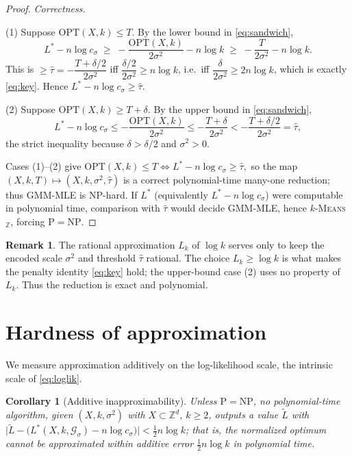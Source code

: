 \documentclass{amsart}
\theoremstyle{plain}
\newtheorem{corollary}{Corollary}
\theoremstyle{definition}
\newtheorem{remark}{Remark}
\newcommand{\Z}{\mathbb{Z}}
\begin{document}
\begin{proof}
\emph{Correctness.}

\noindent(1) Suppose $\mathrm{OPT}(X,k)\le T$. By the lower bound in
\eqref{eq:sandwich},
\[
L^{\ast}-n\log c_{\sigma}
\;\ge\;-\frac{\mathrm{OPT}(X,k)}{2\sigma^{2}}-n\log k
\;\ge\;-\frac{T}{2\sigma^{2}}-n\log k .
\]
This is $\ge\widehat\tau=-\dfrac{T+\delta/2}{2\sigma^{2}}$ iff
$\dfrac{\delta/2}{2\sigma^{2}}\ge n\log k$, i.e.\ iff
$\dfrac{\delta}{2\sigma^{2}}\ge 2n\log k$, which is exactly \eqref{eq:key}. Hence
$L^{\ast}-n\log c_{\sigma}\ge\widehat\tau$.

\noindent(2) Suppose $\mathrm{OPT}(X,k)\ge T+\delta$. By the upper bound in
\eqref{eq:sandwich},
\[
L^{\ast}-n\log c_{\sigma}\le-\frac{\mathrm{OPT}(X,k)}{2\sigma^{2}}
\le-\frac{T+\delta}{2\sigma^{2}}
<-\frac{T+\delta/2}{2\sigma^{2}}=\widehat\tau,
\]
the strict inequality because $\delta>\delta/2$ and $\sigma^{2}>0$.

Cases (1)--(2) give
\(
\mathrm{OPT}(X,k)\le T \iff L^{\ast}-n\log c_{\sigma}\ge\widehat\tau,
\)
so the map $(X,k,T)\mapsto(X,k,\sigma^{2},\widehat\tau)$ is a correct
polynomial-time many-one reduction; thus \textsc{GMM-MLE} is NP-hard. If $L^{\ast}$
(equivalently $L^{\ast}-n\log c_{\sigma}$) were computable in polynomial time,
comparison with $\widehat\tau$ would decide \textsc{GMM-MLE}, hence
\textsc{$k$-Means$_{\Z}$}, forcing $\mathrm{P}=\mathrm{NP}$.
\end{proof}

\begin{remark}
The rational approximation $L_{k}$ of $\log k$ serves only to keep the encoded
scale $\sigma^{2}$ and threshold $\widehat\tau$ rational. The choice
$L_{k}\ge\log k$ is what makes the penalty identity \eqref{eq:key} hold; the
upper-bound case (2) uses no property of $L_{k}$. Thus the reduction is exact and
polynomial.
\end{remark}

\section{Hardness of approximation}

We measure approximation additively on the log-likelihood scale, the intrinsic
scale of \eqref{eq:loglik}.

\begin{corollary}[Additive inapproximability]\label{cor:approx}
Unless $\mathrm{P}=\mathrm{NP}$, no polynomial-time algorithm, given
$(X,k,\sigma^{2})$ with $X\subset\Z^{d}$, $k\ge2$, outputs a value $\widetilde L$
with $\big|\widetilde L-\big(L^{\ast}(X,k,\mathcal G_{\sigma})-n\log c_{\sigma}\big)\big|
<\tfrac12 n\log k$; that is, the normalized optimum cannot be approximated within
additive error $\tfrac12 n\log k$ in polynomial time.
\end{corollary}
\end{document}
